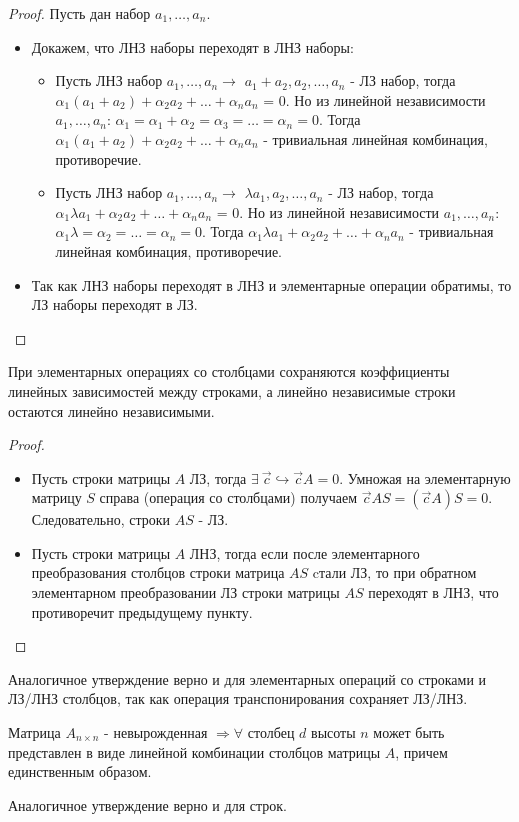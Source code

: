 \begin{proof}
    Пусть дан набор $a_1, \dots, a_n$. 
    \begin{itemize}[leftmargin=*]
        \item Докажем, что ЛНЗ наборы переходят в ЛНЗ наборы: \begin{itemize}
            \item Пусть ЛНЗ набор $a_1, \dots, a_n \rightarrow$ $a_1+a_2, a_2, \dots, a_n$ - ЛЗ набор, тогда $\alpha_1 (a_1+a_2) + \alpha_2 a_2 + \dots +\alpha_n a_n$ = 0. Но из линейной независимости $a_1, \dots, a_n$: $\alpha_1 = \alpha_1 + \alpha_2 = \alpha_3 = \dots =\alpha_n = 0$. Тогда  $\alpha_1 (a_1+a_2) + \alpha_2 a_2 + \dots +\alpha_n a_n$ - тривиальная линейная комбинация, противоречие.
            \item Пусть ЛНЗ набор $a_1, \dots, a_n \rightarrow$ $\lambda a_1, a_2, \dots, a_n$ - ЛЗ набор, тогда $\alpha_1 \lambda a_1 + \alpha_2 a_2 + \dots +\alpha_n a_n$ = 0. Но из линейной независимости $a_1, \dots, a_n$: $\alpha_1 \lambda = \alpha_2 = \dots =\alpha_n = 0$. Тогда $\alpha_1 \lambda a_1 + \alpha_2 a_2 + \dots +\alpha_n a_n$ - тривиальная линейная комбинация, противоречие.
        \end{itemize}
        \item Так как ЛНЗ наборы переходят в ЛНЗ и элементарные операции обратимы, то ЛЗ наборы переходят в ЛЗ.
    \end{itemize}
\end{proof}
\begin{proposition}
    При элементарных операциях со столбцами сохраняются коэффициенты линейных зависимостей между строками, а линейно независимые строки остаются линейно независимыми.
\end{proposition}
\begin{proof}
    \begin{itemize}
        \item Пусть строки матрицы $A$ ЛЗ, тогда $\exists \ \vec{c} \hookrightarrow \vec{c}A=0$. Умножая на элементарную матрицу $S$ справа (операция со столбцами) получаем $\vec{c}AS=(\vec{c}A)S=0$. Следовательно, строки $AS$ - ЛЗ.
        \item Пусть строки матрицы $A$ ЛНЗ, тогда если после элементарного преобразования столбцов строки матрица $AS$ cтали ЛЗ, то при обратном элементарном преобразовании ЛЗ строки матрицы $AS$ переходят в ЛНЗ, что противоречит предыдущему пункту.
    \end{itemize}
\end{proof}
\begin{note}
    Аналогичное утверждение верно и для элементарных операций со строками и ЛЗ/ЛНЗ столбцов, так как операция транспонирования сохраняет ЛЗ/ЛНЗ.
\end{note}
\begin{theorem} [Крамера]
    Матрица $A_{n \times n}$ - невырожденная $\Rightarrow \forall$ столбец $d$ высоты $n$ может быть представлен в виде линейной комбинации столбцов матрицы $A$, причем единственным образом.
\end{theorem}
\begin{note}
    Аналогичное утверждение верно и для строк.
\end{note}
